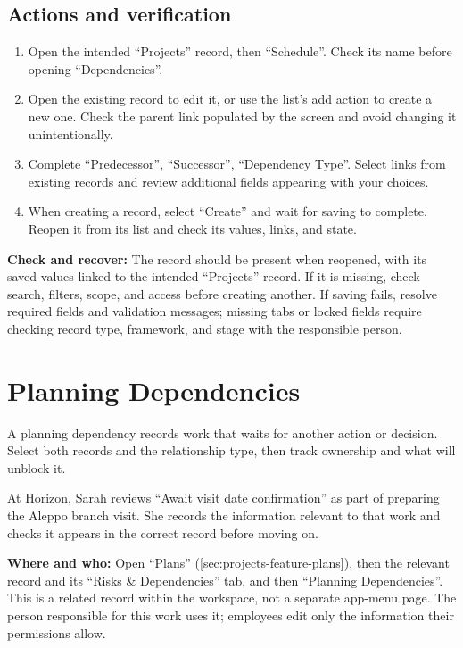 \subsection{Actions and verification}
\begin{enumerate}
\item Open the intended “Projects” record, then “Schedule”. Check its name before opening “Dependencies”.
\item Open the existing record to edit it, or use the list's add action to create a new one. Check the parent link populated by the screen and avoid changing it unintentionally.
\item Complete “Predecessor”, “Successor”, “Dependency Type”. Select links from existing records and review additional fields appearing with your choices.
\item When creating a record, select “Create” and wait for saving to complete. Reopen it from its list and check its values, links, and state.
\end{enumerate}

\textbf{Check and recover:} The record should be present when reopened, with its saved values linked to the intended “Projects” record. If it is missing, check search, filters, scope, and access before creating another. If saving fails, resolve required fields and validation messages; missing tabs or locked fields require checking record type, framework, and stage with the responsible person.

\clearpage
\section{Planning Dependencies}
\label{sec:projects-feature-planning-dependencies}

A planning dependency records work that waits for another action or decision. Select both records and the relationship type, then track ownership and what will unblock it.

\begin{rcnote}
At Horizon, Sarah reviews “Await visit date confirmation” as part of preparing the Aleppo branch visit. She records the information relevant to that work and checks it appears in the correct record before moving on.
\end{rcnote}

\textbf{Where and who:} Open “Plans” (\ref{sec:projects-feature-plans}), then the relevant record and its “Risks \& Dependencies” tab, and then “Planning Dependencies”. This is a related record within the workspace, not a separate app-menu page. The person responsible for this work uses it; employees edit only the information their permissions allow.

